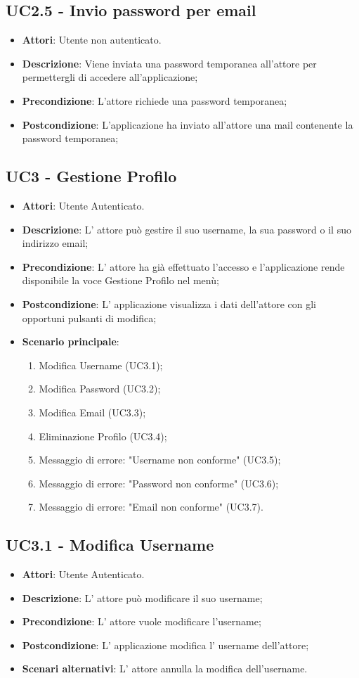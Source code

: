 \subsection{UC2.5 - Invio password per email} 
\label{ssec:UC2.5} 
\begin{itemize} 
\item \textbf{Attori}: Utente non autenticato.
\item \textbf{Descrizione}: Viene inviata una password temporanea all'attore per permettergli di accedere all'applicazione;
\item \textbf{Precondizione}: L'attore richiede una password temporanea;
\item \textbf{Postcondizione}: L'applicazione ha inviato all'attore una mail contenente la password temporanea;
\end{itemize} 
\subsection{UC3 - Gestione Profilo} 
\label{ssec:UC3} 
\begin{itemize} 
\item \textbf{Attori}: Utente Autenticato.
\item \textbf{Descrizione}: L' attore può gestire il suo username, la sua password o il suo indirizzo email;
\item \textbf{Precondizione}: L' attore ha già effettuato l'accesso e l'applicazione rende disponibile la voce Gestione Profilo nel menù;
\item \textbf{Postcondizione}: L' applicazione visualizza i dati dell'attore con gli opportuni pulsanti di modifica;
\item \textbf{Scenario principale}: \begin{enumerate}\item Modifica Username (UC3.1);\item Modifica Password (UC3.2);\item Modifica Email (UC3.3);\item Eliminazione Profilo (UC3.4);\item Messaggio di errore: "Username non conforme" (UC3.5);\item Messaggio di errore: "Password non conforme" (UC3.6);\item Messaggio di errore: "Email non conforme" (UC3.7). 
 \end{enumerate}
\end{itemize} 
\subsection{UC3.1 - Modifica Username} 
\label{ssec:UC3.1} 
\begin{itemize} 
\item \textbf{Attori}: Utente Autenticato.
\item \textbf{Descrizione}: L' attore può modificare il suo username;
\item \textbf{Precondizione}: L'  attore vuole modificare l'username;
\item \textbf{Postcondizione}: L' applicazione modifica l' username dell'attore;
\item \textbf{Scenari alternativi}: L' attore annulla la modifica dell'username.
\end{itemize} 
